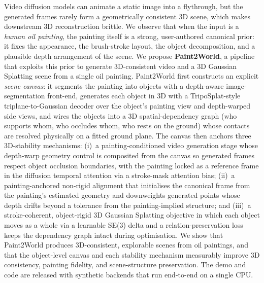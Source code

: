 
Video diffusion models can animate a static image into a flythrough, but the
generated frames rarely form a geometrically consistent 3D scene, which makes
downstream 3D reconstruction brittle. We observe that when the input is a
\emph{human oil painting}, the painting itself is a strong, user-authored
canonical prior: it fixes the appearance, the brush-stroke layout, the object
decomposition, and a plausible depth arrangement of the scene. We propose
\textbf{Paint2World}, a pipeline that exploits this prior to generate
3D-consistent video and a 3D Gaussian Splatting scene from a single oil
painting. Paint2World first constructs an explicit \emph{scene canvas}: it
segments the painting into objects with a depth-aware image-segmentation
front-end, generates each object in 3D with a TripoSplat-style
triplane-to-Gaussian decoder over the object's painting view and
depth-warped side views, and wires the objects into a 3D spatial-dependency
graph (who supports whom, who occludes whom, who rests on the ground) whose
contacts are resolved physically on a fitted ground plane. The canvas then
anchors three 3D-stability mechanisms: (i)~a painting-conditioned video
generation stage whose depth-warp geometry control is composited from the
canvas so generated frames respect object occlusion boundaries, with the
painting locked as a reference frame in the diffusion temporal attention via
a stroke-mask attention bias; (ii)~a painting-anchored non-rigid alignment
that initialises the canonical frame from the painting's estimated geometry
and downweights generated points whose depth drifts beyond a tolerance from
the painting-implied structure; and (iii)~a stroke-coherent, object-rigid 3D
Gaussian Splatting objective in which each object moves as a whole via a
learnable SE(3) delta and a relation-preservation loss keeps the dependency
graph intact during optimisation. We show that Paint2World produces
3D-consistent, explorable scenes from oil paintings, and that the object-level
canvas and each stability mechanism measurably improve 3D consistency,
painting fidelity, and scene-structure preservation. The demo and code are
released with synthetic backends that run end-to-end on a single CPU.
